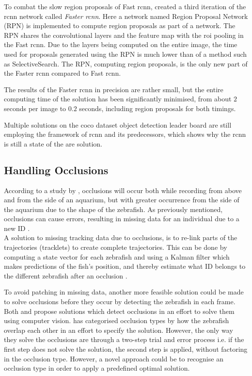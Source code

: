 To combat the slow region proposals of Fast \gls{rcnn}, \cite{Ren2017} created a third iteration of the \gls{rcnn} network called \textit{Faster \gls{rcnn}}. Here a network named Region Proposal Network (RPN) is implemented to compute region proposals as part of a  network. The RPN shares the convolutional layers and the feature map with the \gls{roi} pooling in the Fast \gls{rcnn}. Due to the layers being computed on the entire image, the time used for proposals generated using the RPN is much lower than of a method such as SelectiveSearch. The RPN, computing region proposals, is the only new part of the Faster \gls{rcnn} compared to Fast \gls{rcnn}.

The results of the Faster \gls{rcnn} in precision are rather small, but the entire computing time of the solution has been significantly minimised, from about $2$ seconds per image to $0.2$ seconds, including region proposals for both timings.

Multiple solutions on the \gls{coco} dataset object detection leader board are still employing the framework of \gls{rcnn} and its predecessors, which shows why the \gls{rcnn} is still a state of the are solution.


\subsection{Handling Occlusions}
According to a study by \cite{Qian2017}, occlusions will occur both while recording from above and from the side of an aquarium, but with greater occurrence from the side of the aquarium due to the shape of the zebrafish. As previously mentioned, occlusions can cause errors, resulting in missing data for an individual due to a new ID \citep{Feijo2018}.\\

A solution to missing tracking data due to occlusions, is to re-link parts of the trajectories (tracklets) to create complete trajectories. This can be done by computing a state vector for each zebrafish and using a Kalman filter which makes predictions of the fish’s position, and thereby estimate what ID belongs to the different zebrafish after an occlusion \citep{Feijo2018, Qian2014}.

To avoid patching in missing data, another more feasible solution could be made to solve occlusions before they occur by detecting the zebrafish in each frame. Both \cite{Romero-Ferrero2019} and \cite{Dolado2014} propose solutions which detect occlusions in an effort to solve them using computer vision. \cite{Dolado2014} has categorised occlusion types by how the zebrafish overlap each other in an effort to specify the solution. However, the only way they solve the occlusions are through a two-step trial and error process i.e. if the first step does not solve the solution, the second step is applied, without factoring in the occlusion type. 
However, a novel approach could be to recognise an occlusion type in order to apply a predefined optimal solution.


